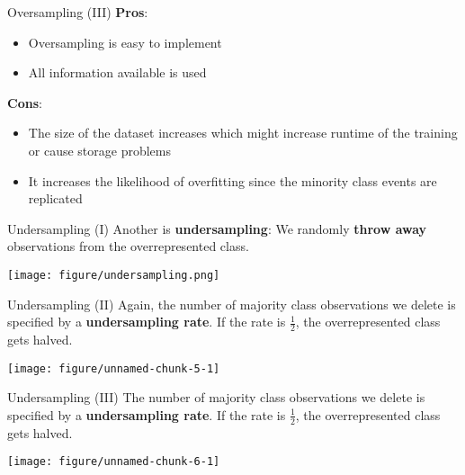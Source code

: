 \documentclass[11pt,compress,t,notes=noshow, aspectratio=169, xcolor=table]{beamer}
\begin{document}
\begin{frame}{Oversampling (III)}
\label{oversampling-iii}
\textbf{Pros}:

\begin{itemize}
\tightlist
\item
  Oversampling is easy to implement
\item
  All information available is used
\end{itemize}

\textbf{Cons}:

\begin{itemize}
\tightlist
\item
  The size of the dataset increases which might increase runtime of the
  training or cause storage problems
\item
  It increases the likelihood of overfitting since the minority class
  events are replicated
\end{itemize}
\end{frame}

\begin{frame}{Undersampling (I)}
\label{undersampling-i}
Another is \textbf{undersampling}: We randomly \textbf{throw away}
observations from the overrepresented class.

\begin{center}
\texttt{[image: figure/undersampling.png]}
\end{center}
\end{frame}

\begin{frame}{Undersampling (II)}
\label{undersampling-ii}
Again, the number of majority class observations we delete is specified
by a \textbf{undersampling rate}. If the rate is \(\frac{1}{2}\), the
overrepresented class gets halved.

\scriptsize

\begin{center}\texttt{[image: figure/unnamed-chunk-5-1]} \end{center}

\normalsize
\end{frame}

\begin{frame}{Undersampling (III)}
\label{undersampling-iii}
The number of majority class observations we delete is specified by a
\textbf{undersampling rate}. If the rate is \(\frac{1}{2}\), the
overrepresented class gets halved.

\scriptsize

\begin{center}\texttt{[image: figure/unnamed-chunk-6-1]} \end{center}

\normalsize
\end{frame}
\end{document}
